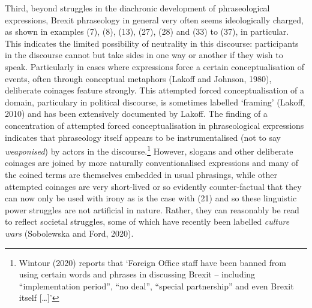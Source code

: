 \documentclass[12pt]{article}
\newenvironment{styleStandard}{\setlength\leftskip{0cm}\setlength\rightskip{0cm plus 1fil}\setlength\parindent{0cm}\setlength\parfillskip{0pt plus 1fil}\setlength\parskip{0in plus 1pt}\writerlistparindent\writerlistleftskip\leavevmode\normalfont\normalsize\writerlistlabel\ignorespaces}{\unskip\vspace{0.111in plus 0.0111in}\par}
\newcommand\writerlistleftskip{}
\newcommand\writerlistparindent{}
\newcommand\writerlistlabel{}
\begin{document}
\begin{styleStandard}
Third, beyond struggles in the diachronic development of phraseological expressions, Brexit phraseology in general very often seems ideologically charged, as shown in examples (7), (8), (13), (27), (28) and (33) to (37), in particular. This indicates the limited possibility of neutrality in this discourse: participants in the discourse cannot but take sides in one way or another if they wish to speak. Particularly in cases where expressions force a certain conceptualisation of events, often through conceptual metaphors (Lakoff and Johnson, 1980), deliberate coinages feature strongly. This attempted forced conceptualisation of a domain, particulary in political discourse, is sometimes labelled ‘framing’ (Lakoff, 2010) and has been extensively documented by Lakoff. The finding of a concentration of attempted forced conceptualisation in phraseological expressions indicates that phraseology itself appears to be instrumentalised (not to say \textit{weaponised}) by actors in the discourse.\footnote{Wintour (2020) reports that ‘Foreign Office staff have been banned from using certain words and phrases in discussing Brexit – including “implementation period”, “no deal”, “special partnership” and even Brexit itself […]’} However, slogans and other deliberate coinages are joined by more naturally conventionalised expressions and many of the coined terms are themselves embedded in usual phrasings, while other attempted coinages are very short-lived or so evidently counter-factual that they can now only be used with irony as is the case with (21) and so these linguistic power struggles are not artificial in nature. Rather, they can reasonably be read to reflect societal struggles, some of which have recently been labelled \textit{culture wars} (Sobolewska and Ford, 2020).
\end{styleStandard}
\end{document}

